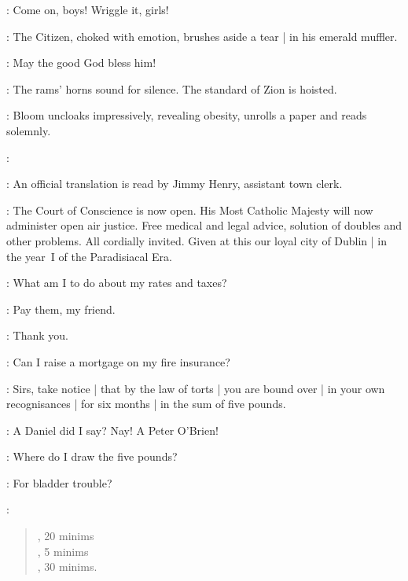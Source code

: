 \Bloom:
Come on,
boys!
Wriggle it,
girls!

:
The Citizen,
choked with emotion,
brushes aside a tear |
in his emerald muffler.

\Citizen:
May the good God bless him!

:
The rams' horns sound for silence.
The standard of Zion is hoisted.%

:
Bloom uncloaks impressively,
revealing obesity,
unrolls a paper and reads solemnly.

\Bloom:

:
An official translation is read by Jimmy Henry,
assistant town clerk.

\JimmyHenry:
The Court of Conscience is now open.
His Most Catholic Majesty will now administer open air justice.
Free medical and legal advice,
solution of doubles and other problems.
All cordially invited.
Given at this our loyal city of Dublin |
in the year~I of the Paradisiacal Era.

\PaddyLeonard[1]:
What am I to do about my rates and taxes?

\Bloom:
Pay them,
my friend.

\PaddyLeonard:
Thank you.

\NoseyFlynn[2]:
Can I raise a mortgage on my fire insurance?%

\Bloom:
Sirs,
take notice |
that by the law of torts |
you are bound over |
in your own recognisances |
for six months |
in the sum of five pounds.

\JJOM[1]:
A Daniel did I say?
Nay!
A Peter O'Brien!

\NoseyFlynn:
Where do I draw the five pounds?


\begin{omitted}
\PisserBurke:
For bladder trouble?

\Bloom:
\begin{verse}
, 20 minims\\
, 5 minims\\
, 30 minims.\\
\end{verse}
\end{omitted}

